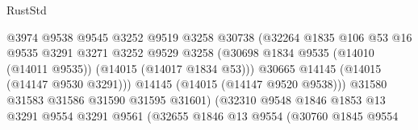 \begin{lexlean}{RustStd}
\begin{coremodule}
                                            @3974
                                            @9538
                                            @9545
                                            @3252
                                            @9519
                                            @3258
                                            @30738
                                            (@32264
                                              @1835
                                              @106
                                              @53
                                              @16
                                              @9535
                                              @3291
                                              @3271
                                              @3252
                                              @9529
                                              @3258
                                              (@30698
                                                @1834
                                                @9535
                                                (@14010 (@14011 @9535))
                                                (@14015 (@14017 @1834 @53)))
                                              @30665
                                              @14145
                                              (@14015 (@14147 @9530 @3291)))
                                            @14145
                                            (@14015 (@14147 @9520 @9538)))
                                          @31580
                                          @31583
                                          @31586
                                          @31590
                                          @31595
                                          @31601)
                                        (@32310
                                          @9548
                                          @1846
                                          @1853
                                          @13
                                          @3291
                                          @9554
                                          @3291
                                          @9561
                                          (@32655
                                            @1846
                                            @13
                                            @9554
                                            (@30760
                                              @1845
                                              @9554

\end{coremodule}
\end{lexlean}
